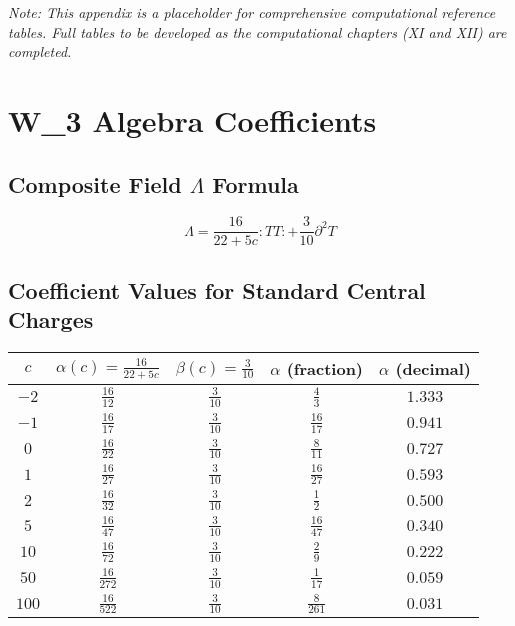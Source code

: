 \textit{Note: This appendix is a placeholder for comprehensive computational reference tables. Full tables to be developed as the computational chapters (XI and XII) are completed.}

\section{W_3 Algebra Coefficients}
\label{app:w3-coefficients}

\subsection{Composite Field $\Lambda$ Formula}

\begin{equation}
\Lambda = \frac{16}{22+5c} :TT: + \frac{3}{10} \partial^2 T
\end{equation}

\subsection{Coefficient Values for Standard Central Charges}

\begin{center}
\begin{tabular}{|c|c|c|c|c|}
\hline
$c$ & $\alpha(c) = \frac{16}{22+5c}$ & $\beta(c) = \frac{3}{10}$ & 
$\alpha$ (fraction) & $\alpha$ (decimal) \\
\hline
$-2$ & $\frac{16}{12}$ & $\frac{3}{10}$ & $\frac{4}{3}$ & $1.333$ \\
\hline
$-1$ & $\frac{16}{17}$ & $\frac{3}{10}$ & $\frac{16}{17}$ & $0.941$ \\
\hline
$0$ & $\frac{16}{22}$ & $\frac{3}{10}$ & $\frac{8}{11}$ & $0.727$ \\
\hline
$1$ & $\frac{16}{27}$ & $\frac{3}{10}$ & $\frac{16}{27}$ & $0.593$ \\
\hline
$2$ & $\frac{16}{32}$ & $\frac{3}{10}$ & $\frac{1}{2}$ & $0.500$ \\
\hline
$5$ & $\frac{16}{47}$ & $\frac{3}{10}$ & $\frac{16}{47}$ & $0.340$ \\
\hline
$10$ & $\frac{16}{72}$ & $\frac{3}{10}$ & $\frac{2}{9}$ & $0.222$ \\
\hline
$50$ & $\frac{16}{272}$ & $\frac{3}{10}$ & $\frac{1}{17}$ & $0.059$ \\
\hline
$100$ & $\frac{16}{522}$ & $\frac{3}{10}$ & $\frac{8}{261}$ & $0.031$ \\
\hline
\end{tabular}
\end{center}

